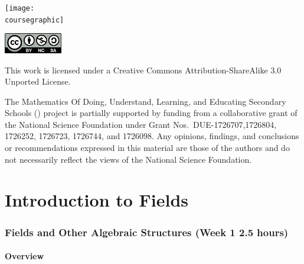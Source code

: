 \documentclass[11pt]{article}
\theoremstyle{definition}
\begin{document}
\maketitle
\ifthenelse{\equal{\coursegraphic}{}} %
	{}
	{\begin{center}\texttt{[image: \\coursegraphic]}\end{center}}
	
\vfill 
\begin{center} \includegraphics[width=1in]{by-nc-sa.png} \end{center}
\footnotesize{ This work is licensed under a Creative Commons Attribution-ShareAlike 3.0 Unported License. }

\footnotesize{
The Mathematics Of Doing, Understand, Learning, and Educating Secondary Schools (\MODULES) project is partially supported by funding from a collaborative grant of the National Science Foundation under Grant Nos.~DUE-1726707,1726804, 1726252, 1726723, 1726744, and 1726098.  Any opinions, findings, and conclusions or recommendations expressed in this material are those of the authors and do not necessarily reflect the views of the National Science Foundation.}
\newpage
\thispagestyle{plain}   
\listoftodos
\tableofcontents
\newpage {}
\newpage 

\part{Introduction to Fields}

\section{Fields and Other Algebraic Structures (Week 1 2.5 hours)}

\subsection{Overview}
 
\end{document}
